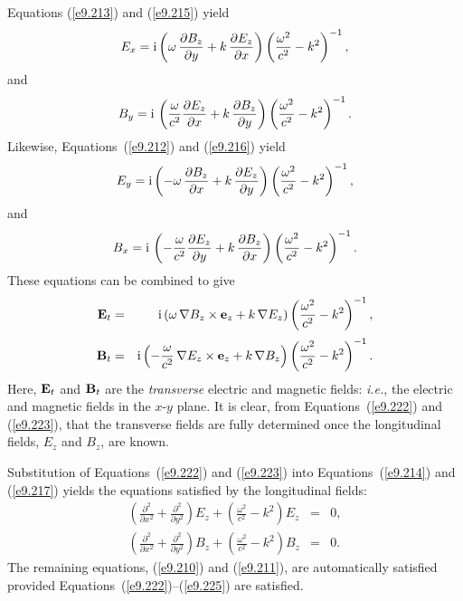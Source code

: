 Equations (\ref{e9.213}) and (\ref{e9.215}) yield
\begin{equation}
E_x = {\rm i}\left(\omega\,\frac{\partial B_z}{\partial y} + k\,\frac{\partial E_z}{\partial x}\right)\left(\frac{\omega^2}{c^2}-k^2\right)^{-1},
\end{equation}
and
\begin{equation}
B_y = {\rm i}\,\left(\frac{\omega}{c^2}\frac{\partial E_z}{\partial x}
+ k\,\frac{\partial B_z}{\partial y}\right)\left(\frac{\omega^2}{c^2}-k^2\right)^{-1}.
\end{equation}
Likewise, Equations~(\ref{e9.212}) and (\ref{e9.216}) yield
\begin{equation}
E_y = {\rm i}\left(-\omega\,\frac{\partial B_z}{\partial x} + k\,\frac{\partial E_z}{\partial y}\right)\left(\frac{\omega^2}{c^2}-k^2\right)^{-1},
\end{equation}
and
\begin{equation}
B_x = {\rm i}\,\left(-\frac{\omega}{c^2}\frac{\partial E_z}{\partial y}
+ k\,\frac{\partial B_z}{\partial x}\right)\left(\frac{\omega^2}{c^2}-k^2\right)^{-1}.
\end{equation}
These equations can be combined to give
\begin{eqnarray}\label{e9.222}
{\bf E}_t&=& {\rm i}\left(\omega\,\nabla B_z\times{\bf e}_z + k\,\nabla
E_z\right)\left(\frac{\omega^2}{c^2}-k^2\right)^{-1},\\[0.5ex]\label{e9.223}
{\bf B}_t &=& {\rm i}\left(-\frac{\omega}{c^2}\,\nabla E_z\times{\bf e}_z + k\,\nabla
B_z\right)\left(\frac{\omega^2}{c^2}-k^2\right)^{-1}.
\end{eqnarray}
Here, ${\bf E}_t$ and ${\bf B}_t$ are the {\em transverse} electric
and magnetic fields: {\em i.e.}, the electric and
magnetic fields in the $x$-$y$ plane. It is clear, from Equations~(\ref{e9.222}) and (\ref{e9.223}), that the transverse fields are fully determined once the
longitudinal fields, $E_z$ and $B_z$, are known.

Substitution of Equations~(\ref{e9.222}) and (\ref{e9.223}) into Equations~(\ref{e9.214}) and (\ref{e9.217}) yields the equations satisfied by
the longitudinal fields:
\begin{eqnarray}\label{e9.224}
\left(\frac{\partial^2}{\partial x^2} + \frac{\partial^2}{\partial y^2}\right)\!
E_z + \left(\frac{\omega^2}{c^2}-k^2\right)\!E_z&=&0,\\[0.5ex]\label{e9.225}
\left(\frac{\partial^2}{\partial x^2} + \frac{\partial^2}{\partial y^2}\right)\!
B_z + \left(\frac{\omega^2}{c^2}-k^2\right)\!B_z&=&0.
\end{eqnarray}
The remaining equations, (\ref{e9.210}) and (\ref{e9.211}), are automatically
satisfied provided Equations~(\ref{e9.222})--(\ref{e9.225}) are satisfied.

